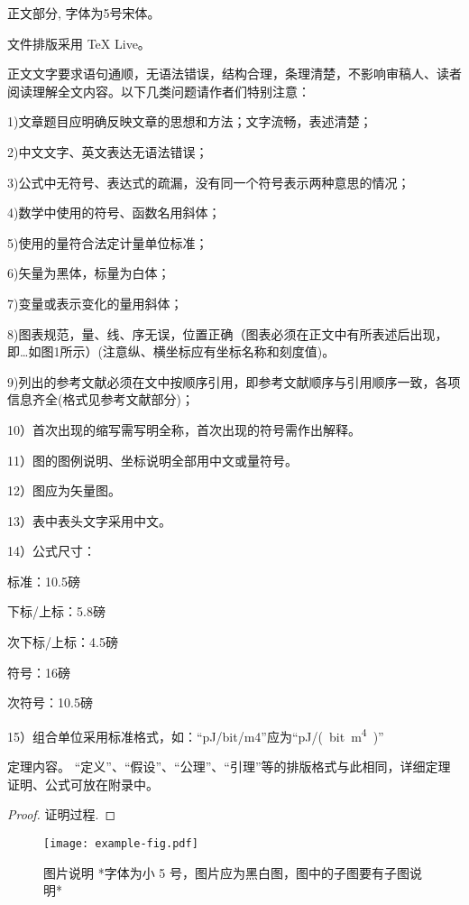 \documentclass{cjc}
\begin{document}

正文部分, 字体为5号宋体。

文件排版采用 TeX Live。

正文文字要求语句通顺，无语法错误，结构合理，条理清楚，不影响审稿人、读者阅读理解全文内容。以下几类问题请作者们特别注意：

1)文章题目应明确反映文章的思想和方法；文字流畅，表述清楚；

2)中文文字、英文表达无语法错误；

3)公式中无符号、表达式的疏漏，没有同一个符号表示两种意思的情况；

4)数学中使用的符号、函数名用斜体；

5)使用的量符合法定计量单位标准；

6)矢量为黑体，标量为白体；

7)变量或表示变化的量用斜体；

8)图表规范，量、线、序无误，位置正确（图表必须在正文中有所表述后出现，即…如图1所示）(注意纵、横坐标应有坐标名称和刻度值)。

9)列出的参考文献必须在文中按顺序引用，即参考文献顺序与引用顺序一致，各项信息齐全(格式见参考文献部分)；

10）首次出现的缩写需写明全称，首次出现的符号需作出解释。

11）图的图例说明、坐标说明全部用中文或量符号。

12）图应为矢量图。

13）表中表头文字采用中文。

14）公式尺寸：

标准：10.5磅

下标/上标：5.8磅

次下标/上标：4.5磅

符号：16磅

次符号：10.5磅

15）组合单位采用标准格式，如：“pJ/bit/m4”应为“\si{pJ/(bit.m^4)}”


\begin{theorem}
  定理内容。
  “定义”、“假设”、“公理”、“引理”等的排版格式与此相同，详细定理证明、公式可放在附录中。
\end{theorem}

\begin{proof}
  证明过程.
\end{proof}

\begin{figure}[htb]
  \centering
  \texttt{[image: example-fig.pdf]}
  \caption{图片说明 *字体为小 5 号，图片应为黑白图，图中的子图要有子图说明*}
\end{figure}
\end{document}
